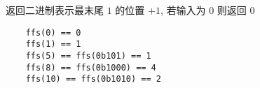 返回二进制表示最末尾 \(1\) 的位置 \(+1\), 若输入为 \(0\) 则返回 \(0\)

\begin{verbatim}
    ffs(0) == 0
    ffs(1) == 1
    ffs(5) == ffs(0b101) == 1
    ffs(8) == ffs(0b1000) == 4
    ffs(10) == ffs(0b1010) == 2
\end{verbatim}
